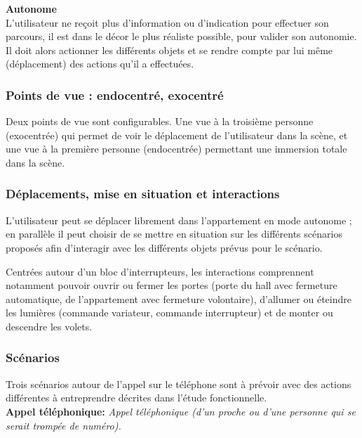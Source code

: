 \textbf{Autonome}
\\

L'utilisateur ne reçoit plus d'information ou d'indication pour effectuer son parcours, il est dans le décor le plus réaliste possible, pour valider son autonomie. Il doit alors actionner les différents objets et se rendre compte par lui même (déplacement) des actions qu'il a effectuées.

\subsubsection{Points de vue : endocentré, exocentré}

Deux points de vue sont configurables. Une vue à la troisième personne (exocentrée) qui permet de voir le déplacement de l'utilisateur dans la scène, et une vue à la première personne (endocentrée) permettant une immersion totale dans la scène.

\subsubsection{Déplacements, mise en situation et interactions}

L'utilisateur peut se déplacer librement dans l'appartement en mode autonome ; en parallèle il peut choisir de se mettre en situation sur les différents scénarios proposés afin d'interagir avec les différents objets prévus pour le scénario.

Centrées autour d'un bloc d'interrupteurs, les interactions comprennent notamment pouvoir ouvrir ou fermer les portes (porte du hall avec fermeture automatique, de l'appartement avec fermeture volontaire), d'allumer ou éteindre les lumières (commande variateur, commande interrupteur) et de monter ou descendre les volets.

\subsubsection{Scénarios}
Trois scénarios autour de l'appel sur le téléphone sont à prévoir avec des actions différentes à entreprendre décrites dans l'étude fonctionnelle. \\

\textbf{Appel téléphonique: }\textit{Appel téléphonique (d'un proche ou d'une personne qui se serait trompée de numéro). }

